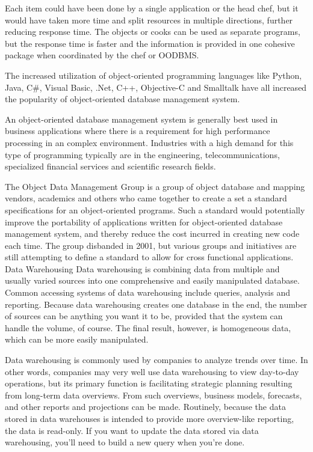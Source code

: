 Each item could have been done by a single application or the head chef, but it would have taken more time and split resources in multiple directions, further reducing response time. The objects or cooks can be used as separate programs, but the response time is faster and the information is provided in one cohesive package when coordinated by the chef or OODBMS.
 
The increased utilization of object-oriented programming languages like Python, Java, C#, Visual Basic, .Net, C++, Objective-C and Smalltalk have all increased the popularity of object-oriented database management system.
 
An object-oriented database management system is generally best used in business applications where there is a requirement for high performance processing in an complex environment. Industries with a high demand for this type of programming typically are in the engineering, telecommunications, specialized financial services and scientific research fields.
 
The Object Data Management Group is a group of object database and mapping vendors, academics and others who came together to create a set a standard specifications for an object-oriented programs. Such a standard would potentially improve the portability of applications written for object-oriented database management system, and thereby reduce the cost incurred in creating new code each time. The group disbanded in 2001, but various groups and initiatives are still attempting to define a standard to allow for cross functional applications.
Data Warehousing
Data warehousing is combining data from multiple and usually varied sources into one comprehensive and easily manipulated database. Common accessing systems of data warehousing include queries, analysis and reporting. Because data warehousing creates one database in the end, the number of sources can be anything you want it to be, provided that the system can handle the volume, of course. The final result, however, is homogeneous data, which can be more easily manipulated.
 
Data warehousing is commonly used by companies to analyze trends over time. In other words, companies may very well use data warehousing to view day-to-day operations, but its primary function is facilitating strategic planning resulting from long-term data overviews. From such overviews, business models, forecasts, and other reports and projections can be made. Routinely, because the data stored in data warehouses is intended to provide more overview-like reporting, the data is read-only. If you want to update the data stored via data warehousing, you'll need to build a new query when you're done.
 
